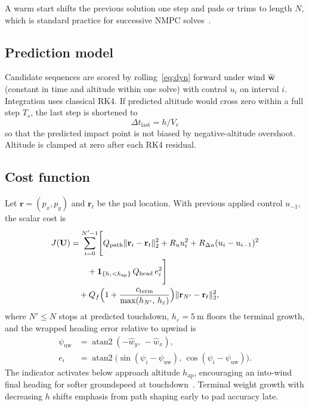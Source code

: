 \documentclass[conference]{IEEEtran}
\begin{document}
A warm start shifts the previous solution one step and pads or trims to length $N$, which is standard practice for successive NMPC solves~\cite{Rawlings2017}.

\subsection{Prediction model}

Candidate sequences are scored by rolling~\eqref{eq:dyn} forward under wind $\hat{\mathbf{w}}$ (constant in time and altitude within one solve) with control $u_i$ on interval $i$.
Integration uses classical RK4.
If predicted altitude would cross zero within a full step $T_s$, the last step is shortened to
\begin{equation}
\Delta t_{\mathrm{last}} = h / V_v
\label{eq:dtlast}
\end{equation}
so that the predicted impact point is not biased by negative-altitude overshoot.
Altitude is clamped at zero after each RK4 residual.

\subsection{Cost function}

Let $\mathbf{r}=(p_x,p_y)$ and $\mathbf{r}_t$ be the pad location.
With previous applied control $u_{-1}$, the scalar cost is
\begin{equation}
\begin{aligned}
J(\mathbf{U})
&=
\sum_{i=0}^{N'-1}
\Biggl[
Q_{\mathrm{path}}\|\mathbf{r}_i-\mathbf{r}_t\|_2^2
+
R_u u_i^2
+
R_{\Delta u}(u_i-u_{i-1})^2
\\
&\qquad
+
\mathbf{1}_{\{h_i < h_{\mathrm{ap}}\}}\,
Q_{\mathrm{head}}\,e_i^2
\Biggr]
\\
&\quad
+
Q_f\Bigl(1+\frac{c_{\mathrm{term}}}{\max(h_{N'},\,h_{\varepsilon})}\Bigr)
\|\mathbf{r}_{N'}-\mathbf{r}_t\|_2^2,
\end{aligned}
\label{eq:cost}
\end{equation}
where $N'\le N$ stops at predicted touchdown, $h_{\varepsilon}=\SI{5}{\meter}$ floors the terminal growth, and the wrapped heading error relative to upwind is
\begin{equation}
\begin{aligned}
\psi_{\mathrm{uw}}
&=
\operatorname{atan2}(-\hat{w}_y,\,-\hat{w}_x),
\\
e_i
&=
\operatorname{atan2}\bigl(\sin(\psi_i-\psi_{\mathrm{uw}}),\,
\cos(\psi_i-\psi_{\mathrm{uw}})\bigr).
\end{aligned}
\label{eq:head}
\end{equation}
The indicator activates below approach altitude $h_{\mathrm{ap}}$, encouraging an into-wind final heading for softer groundspeed at touchdown~\cite{SlegersYakimenko2009,SlegersYakimenko2011}.
Terminal weight growth with decreasing $h$ shifts emphasis from path shaping early to pad accuracy late.
\end{document}
